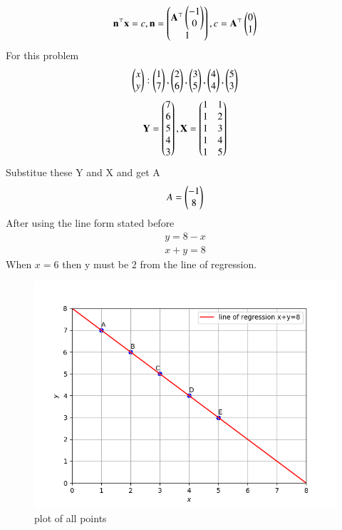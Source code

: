 \documentclass[journal,12pt,twocolumn]{IEEEtran}
\begin{document}
  \begin{align}
  	\mathbf{n}^{\top}\mathbf{x}=c, \mathbf{n}=\begin{pmatrix}\mathbf{A}^{\top}\begin{pmatrix}-1\\0\end{pmatrix}\\1\end{pmatrix},c=\mathbf{A}^{\top}\begin{pmatrix}0\\1\end{pmatrix}
  \end{align}
	For this problem 
	\begin{align}
		\begin{pmatrix}x \\y \end{pmatrix}:
	\begin{pmatrix}1 \\7 \end{pmatrix},
	\begin{pmatrix}2 \\6 \end{pmatrix},
	\begin{pmatrix}3 \\5 \end{pmatrix},
    \begin{pmatrix}4 \\4 \end{pmatrix},
    \begin{pmatrix}5 \\3 \end{pmatrix}
	\end{align}
\begin{align}
	\mathbf{Y}=\begin{pmatrix}7\\6\\5\\4\\3\end{pmatrix},
	\mathbf{X}=\begin{pmatrix}1&1\\1&2\\1&3\\1&4\\1&5\end{pmatrix}
\end{align}
Substitue these Y and X and get A 
\begin{align}
	A=\begin{pmatrix}-1\\8\end{pmatrix}
\end{align}
	After using the line form stated before
	\begin{align}
		y=8-x\\
		x+y=8
	\end{align}
	When $x=6$ then y must be 2 from the line of regression.
	
	\begin{figure}[h!]
		\centering
		\includegraphics[width=\columnwidth]{./figs/fig1.png}
		\caption{plot of all points}
		\label{Fig1}
	\end{figure}
	
\end{document}
